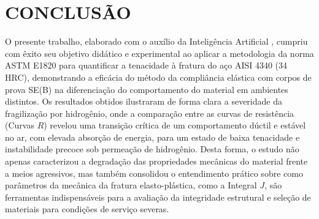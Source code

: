 \section{\MakeUppercase{Conclusão}}
O presente trabalho, elaborado com o auxílio da Inteligência Artificial , cumpriu com êxito seu objetivo didático e experimental ao aplicar a metodologia da norma ASTM E1820 para quantificar a tenacidade à fratura do aço AISI 4340 (34 HRC), demonstrando a eficácia do método da compliância elástica com corpos de prova SE(B) na diferenciação do comportamento do material em ambientes distintos. Os resultados obtidos ilustraram de forma clara a severidade da fragilização por hidrogênio, onde a comparação entre as curvas de resistência (Curvas $R$) revelou uma transição crítica de um comportamento dúctil e estável no ar, com elevada absorção de energia, para um estado de baixa tenacidade e instabilidade precoce sob permeação de hidrogênio. Desta forma, o estudo não apenas caracterizou a degradação das propriedades mecânicas do material frente a meios agressivos, mas também consolidou o entendimento prático sobre como parâmetros da mecânica da fratura elasto-plástica, como a Integral $J$, são ferramentas indispensáveis para a avaliação da integridade estrutural e seleção de materiais para condições de serviço severas.